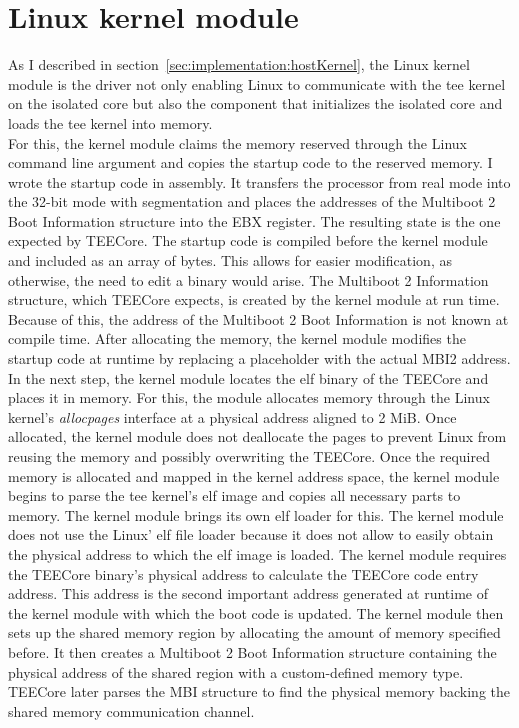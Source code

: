 \section{Linux kernel module}
\label{sec:implementation:kmod}
As I described in section~\ref{sec:implementation:hostKernel}, the Linux kernel
module is the driver not only enabling Linux to communicate with the \gls{tee}
kernel on the isolated core but also the component that initializes the isolated
core and loads the \gls{tee} kernel into memory.\\

For this, the kernel module claims the memory reserved through the Linux command
line argument and copies the startup code to the reserved memory. I wrote the
startup code in assembly. It transfers the processor from real mode into the
32-bit mode with segmentation and places the addresses of the Multiboot 2 Boot
Information structure into the EBX register. The resulting state is the one
expected by TEECore. The startup code is compiled before the kernel module and
included as an array of bytes. This allows for easier modification, as
otherwise, the need to edit a binary would arise. The Multiboot 2 Information
structure, which TEECore expects, is created by the kernel module at run time.
Because of this, the address of the Multiboot 2 Boot Information is not known at
compile time. After allocating the memory, the kernel module modifies the
startup code at runtime by replacing a placeholder with the actual MBI2
address.\\

In the next step, the kernel module locates the \gls{elf} binary of the TEECore
and places it in memory. For this, the module allocates memory through the Linux
kernel's \textit{allocpages} interface at a physical address aligned to 2 MiB.
Once allocated, the kernel module does not deallocate the pages to prevent Linux
from reusing the memory and possibly overwriting the TEECore. Once the required
memory is allocated and mapped in the kernel address space, the kernel module
begins to parse the \gls{tee} kernel's \gls{elf} image and copies all necessary
parts to memory. The kernel module brings its own \gls{elf} loader for this. The
kernel module does not use the Linux' \gls{elf} file loader because it does not
allow to easily obtain the physical address to which the \gls{elf} image is
loaded. The kernel module requires the TEECore binary's physical address to
calculate the TEECore code entry address. This address is the second important
address generated at runtime of the kernel module with which the boot code is
updated. The kernel module then sets up the shared memory region by allocating
the amount of memory specified before. It then creates a Multiboot 2 Boot
Information structure containing the physical address of the shared region with
a custom-defined memory type. TEECore later parses the MBI structure to find the
physical memory backing the shared memory communication channel.\\

